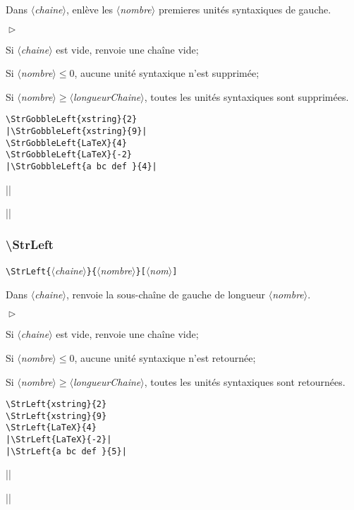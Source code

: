 \documentclass[a4paper,10pt]{article}
\newcommand\argu[1]{$\langle$\textit{#1}$\rangle$}
\newcommand\ARGU[1]{\texttt{\color{black}\{}\argu{#1}\texttt{\color{black}\}}}
\newcommand\arguC[1]{\texttt{\color{black}[}\argu{#1}\texttt{\color{black}]}}
\newenvironment{Conditions}[1][1cm]%
{\begin{list}%
	{$\vartriangleright$}%
	{\setlength{\leftmargin}{#1}
	 \setlength{\itemsep}{0pt}
	 \setlength{\parsep}{0pt}
	 \setlength{\topsep}{2ptplus3ptminus2pt}
	}}%
{\end{list}}
\newcommand\US{unité syntaxique\xspace}
\newcommand\USs{unités syntaxiques\xspace}
\newcommand\styleexemple{\small\vskip4pt}
\newcommand\verbinline{\lstinline[basicstyle=\normalsize\ttfamily]}
\begin{document}
Dans \argu{chaine}, enlève les \argu{nombre} premieres \USs de gauche.\medskip

\begin{Conditions}
	\item Si \argu{chaine} est vide, renvoie une chaîne vide;
	\item Si \argu{nombre}${}\leqslant0$, aucune \US n'est supprimée;
	\item Si \argu{nombre}${}\geqslant{}$\argu{longueurChaine}, toutes les \USs sont supprimées.
\end{Conditions}

\begin{minipage}[t]{0.65\linewidth}
\begin{lstlisting}
\StrGobbleLeft{xstring}{2}
|\StrGobbleLeft{xstring}{9}|
\StrGobbleLeft{LaTeX}{4}
\StrGobbleLeft{LaTeX}{-2}
|\StrGobbleLeft{a bc def }{4}|
\end{lstlisting}%
\end{minipage}\hfill
\begin{minipage}[t]{0.35\linewidth}
	\styleexemple
	\par
	||\par
	\par
	\par
	||
\end{minipage}%

\subsubsection{\ttfamily\textbackslash StrLeft}
\verbinline|\StrLeft|\ARGU{chaine}\ARGU{nombre}\arguC{nom}
\smallskip

Dans \argu{chaine}, renvoie la sous-chaîne de gauche de longueur \argu{nombre}.\medskip

\begin{Conditions}
	\item Si \argu{chaine} est vide, renvoie une chaîne vide;
	\item Si \argu{nombre}${}\leqslant0$, aucune \US n'est retournée;
	\item Si \argu{nombre}${}\geqslant{}$\argu{longueurChaine}, toutes les \USs sont retournées.
\end{Conditions}

\begin{minipage}[t]{0.65\linewidth}
\begin{lstlisting}
\StrLeft{xstring}{2}
\StrLeft{xstring}{9}
\StrLeft{LaTeX}{4}
|\StrLeft{LaTeX}{-2}|
|\StrLeft{a bc def }{5}|
\end{lstlisting}%
\end{minipage}\hfill
\begin{minipage}[t]{0.35\linewidth}
	\styleexemple
	\par
	\par
	\par
	||\par
	||
\end{minipage}%
\end{document}
